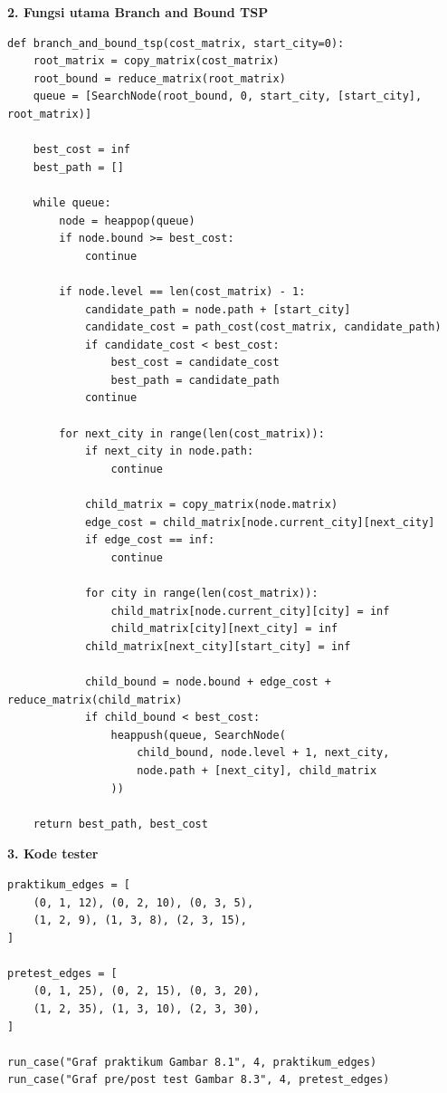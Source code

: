 \textbf{2. Fungsi utama Branch and Bound TSP}
\begin{lstlisting}[basicstyle=\ttfamily\scriptsize, frame=single, backgroundcolor=\color{white}, numbers=none, keywordstyle=\color{black}, commentstyle=\color{black}, stringstyle=\color{black}, breaklines=true]
def branch_and_bound_tsp(cost_matrix, start_city=0):
    root_matrix = copy_matrix(cost_matrix)
    root_bound = reduce_matrix(root_matrix)
    queue = [SearchNode(root_bound, 0, start_city, [start_city], root_matrix)]

    best_cost = inf
    best_path = []

    while queue:
        node = heappop(queue)
        if node.bound >= best_cost:
            continue

        if node.level == len(cost_matrix) - 1:
            candidate_path = node.path + [start_city]
            candidate_cost = path_cost(cost_matrix, candidate_path)
            if candidate_cost < best_cost:
                best_cost = candidate_cost
                best_path = candidate_path
            continue

        for next_city in range(len(cost_matrix)):
            if next_city in node.path:
                continue

            child_matrix = copy_matrix(node.matrix)
            edge_cost = child_matrix[node.current_city][next_city]
            if edge_cost == inf:
                continue

            for city in range(len(cost_matrix)):
                child_matrix[node.current_city][city] = inf
                child_matrix[city][next_city] = inf
            child_matrix[next_city][start_city] = inf

            child_bound = node.bound + edge_cost + reduce_matrix(child_matrix)
            if child_bound < best_cost:
                heappush(queue, SearchNode(
                    child_bound, node.level + 1, next_city,
                    node.path + [next_city], child_matrix
                ))

    return best_path, best_cost
\end{lstlisting}

\textbf{3. Kode tester}
\begin{lstlisting}[basicstyle=\ttfamily\scriptsize, frame=single, backgroundcolor=\color{white}, numbers=none, keywordstyle=\color{black}, commentstyle=\color{black}, stringstyle=\color{black}, breaklines=true]
praktikum_edges = [
    (0, 1, 12), (0, 2, 10), (0, 3, 5),
    (1, 2, 9), (1, 3, 8), (2, 3, 15),
]

pretest_edges = [
    (0, 1, 25), (0, 2, 15), (0, 3, 20),
    (1, 2, 35), (1, 3, 10), (2, 3, 30),
]

run_case("Graf praktikum Gambar 8.1", 4, praktikum_edges)
run_case("Graf pre/post test Gambar 8.3", 4, pretest_edges)
\end{lstlisting}

